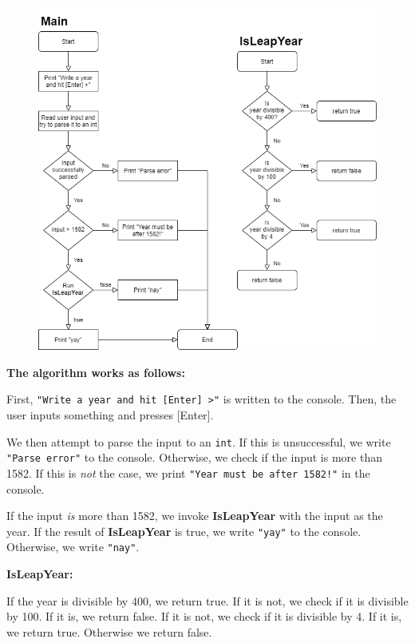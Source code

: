 \documentclass[11pt,a4paper]{article}
\begin{document}
\begin{figure}
    \centering
    \includegraphics[width=\textwidth]{Documentation/img/IsLeapYear.drawio.png}
    \label{fig:my_label}
\end{figure}

\textbf{The algorithm works as follows:}

First, \texttt{"Write a year and hit [Enter] >"} is written to the console. Then, the user inputs something and presses [Enter].

We then attempt to parse the input to an \texttt{int}. If this is unsuccessful, we write \texttt{"Parse error"} to the console. Otherwise, we check if the input is more than 1582.
If this is \textit{not} the case, we print \texttt{"Year must be after 1582!"} in the console.

If the input \textit{is} more than 1582, we invoke \textbf{IsLeapYear} with the input as the year.
If the result of \textbf{IsLeapYear} is true, we write \texttt{"yay"} to the console. Otherwise, we write \texttt{"nay"}.

\textbf{IsLeapYear:}

If the year is divisible by 400, we return true. If it is not, we check if it is divisible by 100. If it is, we return false. If it is not, we check if it is divisible by 4. If it is, we return true. Otherwise we return false.
\end{document}
